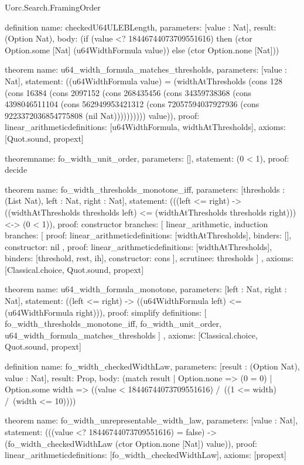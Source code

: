 \begin{lexlean}{Uorc.Search.FramingOrder}
\begin{semanticmodule}
definition{
  name: checkedU64ULEBLength,
  parameters: [value : Nat],
  result: (Option Nat),
  body: (if (value <? 18446744073709551616) then (ctor Option.some [Nat] (u64WidthFormula value)) else (ctor Option.none [Nat]))
}

theorem{
  name: u64_width_formula_matches_thresholds,
  parameters: [value : Nat],
  statement: ((u64WidthFormula value) = (widthAtThresholds (cons 128 (cons 16384 (cons 2097152 (cons 268435456 (cons 34359738368 (cons 4398046511104 (cons 562949953421312 (cons 72057594037927936 (cons 9223372036854775808 (nil Nat)))))))))) value)),
  proof: linear_arithmetic{definitions: [u64WidthFormula, widthAtThresholds]},
  axioms: [Quot.sound, propext]
}

theorem{name: fo_width_unit_order, parameters: [], statement: (0 < 1), proof: decide{}}

theorem{
  name: fo_width_thresholds_monotone_iff,
  parameters: [thresholds : (List Nat), left : Nat, right : Nat],
  statement: (((left <= right) -> ((widthAtThresholds thresholds left) <= (widthAtThresholds thresholds right))) <-> (0 < 1)),
  proof: constructor{
    branches: [
      linear_arithmetic{},
      induction{
        branches: [
          {
            proof: linear_arithmetic{definitions: [widthAtThresholds]},
            binders: [],
            constructor: nil
          },
          {
            proof: linear_arithmetic{definitions: [widthAtThresholds]},
            binders: [threshold, rest, ih],
            constructor: cons
          }
        ],
        scrutinee: thresholds
      }
    ]
  },
  axioms: [Classical.choice, Quot.sound, propext]
}

theorem{
  name: u64_width_formula_monotone,
  parameters: [left : Nat, right : Nat],
  statement: ((left <= right) -> ((u64WidthFormula left) <= (u64WidthFormula right))),
  proof: simplify{
    definitions: [
      fo_width_thresholds_monotone_iff,
      fo_width_unit_order,
      u64_width_formula_matches_thresholds
    ]
  },
  axioms: [Classical.choice, Quot.sound, propext]
}

definition{
  name: fo_width_checkedWidthLaw,
  parameters: [result : (Option Nat), value : Nat],
  result: Prop,
  body: (match result
    | Option.none => (0 = 0)
    | Option.some width => ((value < 18446744073709551616) /\ ((1 <= width) /\ (width <= 10))))
}

theorem{
  name: fo_width_unrepresentable_width_law,
  parameters: [value : Nat],
  statement: (((value <? 18446744073709551616) = false) -> (fo_width_checkedWidthLaw (ctor Option.none [Nat]) value)),
  proof: linear_arithmetic{definitions: [fo_width_checkedWidthLaw]},
  axioms: [propext]
}


\end{semanticmodule}
\end{lexlean}
